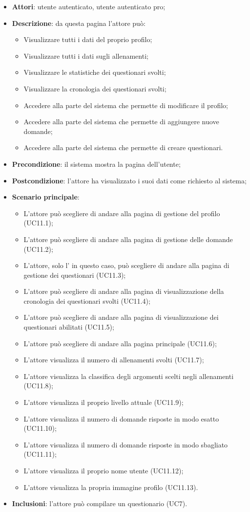 \begin{itemize}
\item\textbf{Attori}: utente autenticato, utente autenticato pro;
\item\textbf{Descrizione}: da questa pagina l'attore può: 
\begin{itemize}
	\item Visualizzare tutti i dati del proprio profilo;
	\item Visualizzare tutti i dati sugli allenamenti;
	\item Visualizzare le statistiche dei questionari svolti;
	\item Visualizzare la cronologia dei questionari svolti;
	\item Accedere alla parte del sistema che permette di modificare il profilo;
	\item Accedere alla parte del sistema che permette di aggiungere nuove domande;
	\item Accedere alla parte del sistema che permette di creare questionari.
\end{itemize}
\item\textbf{Precondizione}: il sistema mostra la pagina dell'utente;
\item\textbf{Postcondizione}: l'attore ha visualizzato i suoi dati come richiesto al sistema;
\item\textbf{Scenario principale}:
\begin{itemize}
\item L'attore può scegliere di andare alla pagina di gestione del profilo (UC11.1);
\item L'attore può scegliere di andare alla pagina di gestione delle domande (UC11.2);  
\item L'attore, solo l'\uaupro{} in questo caso, può scegliere di andare alla pagina di gestione dei questionari (UC11.3);
\item L'attore può scegliere di andare alla pagina di visualizzazione della cronologia dei questionari svolti (UC11.4);
\item L'attore può scegliere di andare alla pagina di visualizzazione dei questionari abilitati (UC11.5);
\item L'attore può scegliere di andare alla pagina principale (UC11.6);
\item L'attore visualizza il numero di allenamenti svolti (UC11.7);
\item L'attore visualizza la classifica degli argomenti scelti negli allenamenti (UC11.8);
\item L'attore visualizza il proprio livello attuale (UC11.9);
\item L'attore visualizza il numero di domande risposte in modo esatto (UC11.10);
\item L'attore visualizza il numero di domande risposte in modo sbagliato (UC11.11);
\item L'attore visualizza il proprio nome utente (UC11.12);
\item L'attore visualizza la propria immagine profilo (UC11.13).
\end{itemize}
\item\textbf{Inclusioni}: l'attore può compilare un questionario (UC7).
\end{itemize}

